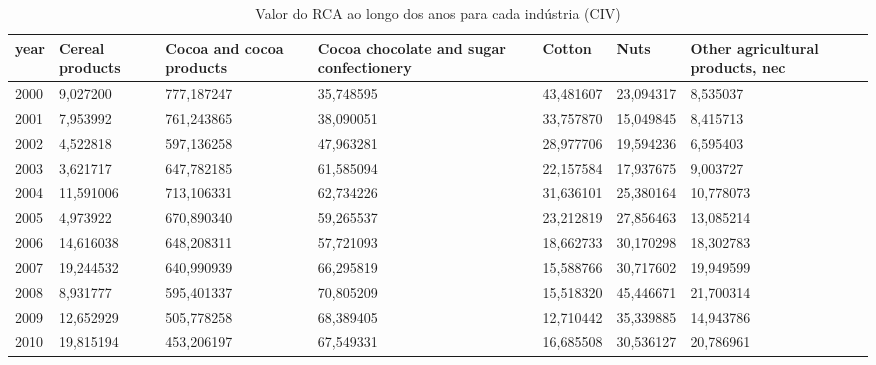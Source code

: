 \begin{table}
\centering
\caption{Valor do RCA ao longo dos anos para cada indústria (CIV)}
\begin{tabular}{p{1cm}p{2cm}p{2cm}p{2cm}p{2cm}p{2cm}p{2cm}}
\toprule
 year &  Cereal products &  Cocoa and cocoa products &  Cocoa chocolate and sugar confectionery &    Cotton &      Nuts &  Other agricultural products, nec \\
\midrule
 2000 &         9,027200 &                777,187247 &                                35,748595 & 43,481607 & 23,094317 &                          8,535037 \\
 2001 &         7,953992 &                761,243865 &                                38,090051 & 33,757870 & 15,049845 &                          8,415713 \\
 2002 &         4,522818 &                597,136258 &                                47,963281 & 28,977706 & 19,594236 &                          6,595403 \\
 2003 &         3,621717 &                647,782185 &                                61,585094 & 22,157584 & 17,937675 &                          9,003727 \\
 2004 &        11,591006 &                713,106331 &                                62,734226 & 31,636101 & 25,380164 &                         10,778073 \\
 2005 &         4,973922 &                670,890340 &                                59,265537 & 23,212819 & 27,856463 &                         13,085214 \\
 2006 &        14,616038 &                648,208311 &                                57,721093 & 18,662733 & 30,170298 &                         18,302783 \\
 2007 &        19,244532 &                640,990939 &                                66,295819 & 15,588766 & 30,717602 &                         19,949599 \\
 2008 &         8,931777 &                595,401337 &                                70,805209 & 15,518320 & 45,446671 &                         21,700314 \\
 2009 &        12,652929 &                505,778258 &                                68,389405 & 12,710442 & 35,339885 &                         14,943786 \\
 2010 &        19,815194 &                453,206197 &                                67,549331 & 16,685508 & 30,536127 &                         20,786961 \\

\end{tabular}
\end{table}
